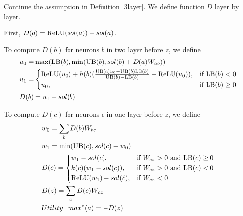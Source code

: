 \begin{definition}
	Continue the assumption in Definition \ref{3layer}. We define function $D$ layer by layer.
	
	First, $D(a) = \mathrm{ReLU}(sol(a))-sol(\hat{a})$.
	
To compute $D(b)$ for neurons $b$ in two layer before $z$, we define \begin{align}
	&u_0 = \max(\mathrm{LB}(b),\min(\mathrm{UB}(b),  sol(b)+D(a)W_{ab}))\\
	&u_1 = \begin{cases}
		\mathrm{ReLU}(u_0)+h(b)(\frac{\mathrm{UB}(c)u_0-\mathrm{UB}(b)\mathrm{LB}(b)}{\mathrm{UB}(b)-\mathrm{LB}(b)}-\mathrm{ReLU}(u_0)), & \text{if }\mathrm{LB}(b) < 0\\
	u_0, & \text{if }  \mathrm{LB}(b) \geq 0
	\end{cases}\\
	&D(b) = u_1-sol(\hat{b})
\end{align}
	
	To compute $D(c)$ for neurons $c$ in one layer before $z$, we define 
	\begin{align}
		&w_0 = \sum_b D(b)W_{bc}\\
		&w_1 = \min(\mathrm{UB}(c),sol(c)+w_0)\\		
		&D(c) =
		\begin{cases}
			w_1-sol({c}), & \text{if }W_{cz} > 0 \text{ and } \mathrm{LB}(c)\geq 0\\
		k(c)(w_1-sol({c})), & \text{if }W_{cz} > 0 \text{ and } \mathrm{LB}(c)< 0\\
		\mathrm{ReLU}(w_1)-sol(\hat{c})	, & \text{if }  W_{cz} < 0
		\end{cases}\\
		&D(z) = \sum_c D(c)W_{cz}\\
		&Utility\_max^z(a) = -D(z)
	\end{align}
\end{definition}
		
\fi